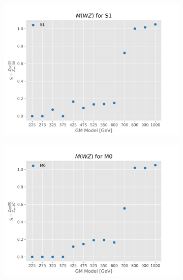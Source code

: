 \documentclass[../Bachelorarbeit.tex]{subfiles}
\begin{document}
\begin{figure}[h]
    \centering
    \begin{subfigure}{0.45\textwidth}
        \includegraphics[width=\textwidth]{Plots/gm_relevanze/MWZ_op_S1.png}

    \end{subfigure}
    \begin{subfigure}{0.45\textwidth}
        \includegraphics[width=\textwidth]{Plots/gm_relevanze/MWZ_op_M0.png}


\end{subfigure}
\end{figure}
\end{document}

